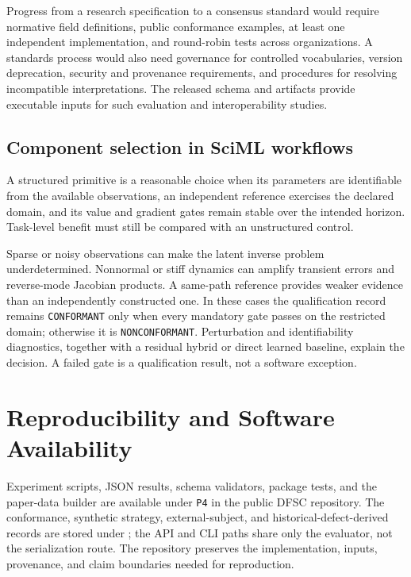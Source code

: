 \documentclass[preprint,12pt]{elsarticle}
\begin{document}
Progress from a research specification to a consensus standard would require normative field definitions, public conformance examples, at least one independent implementation, and round-robin tests across organizations. A standards process would also need governance for controlled vocabularies, version deprecation, security and provenance requirements, and procedures for resolving incompatible interpretations. The released schema and artifacts provide executable inputs for such evaluation and interoperability studies.

\subsection{Component selection in SciML workflows}
A structured primitive is a reasonable choice when its parameters are identifiable from the available observations, an independent reference exercises the declared domain, and its value and gradient gates remain stable over the intended horizon. Task-level benefit must still be compared with an unstructured control.

Sparse or noisy observations can make the latent inverse problem underdetermined. Nonnormal or stiff dynamics can amplify transient errors and reverse-mode Jacobian products. A same-path reference provides weaker evidence than an independently constructed one. In these cases the qualification record remains \texttt{CONFORMANT} only when every mandatory gate passes on the restricted domain; otherwise it is \texttt{NONCONFORMANT}. Perturbation and identifiability diagnostics, together with a residual hybrid or direct learned baseline, explain the decision. A failed gate is a qualification result, not a software exception.

\section{Reproducibility and Software Availability}
Experiment scripts, JSON results, schema validators, package tests, and the paper-data builder are available under \texttt{P4} in the public DFSC repository. The conformance, synthetic strategy, external-subject, and historical-defect-derived records are stored under ; the API and CLI paths share only the evaluator, not the serialization route. The repository preserves the implementation, inputs, provenance, and claim boundaries needed for reproduction.
\end{document}
